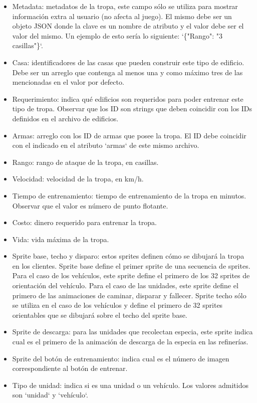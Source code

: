 \documentclass[titlepage,a4paper,12pt]{article}
\begin{document}
\begin{itemize}
\begin{itemize}
\item Metadata: metadatos de la tropa, este campo sólo se utiliza para mostrar información extra al usuario (no afecta al juego). El mismo debe ser un objeto JSON donde la clave es un nombre de atributo y el valor debe ser el valor del mismo. Un ejemplo de esto sería lo siguiente: `\{"Rango": "3 casillas"\}`.

\item Casa: identificadores de las casas que pueden construir este tipo de edificio. Debe ser un arreglo que contenga al menos una y como máximo tres de las mencionadas en el valor por defecto. 

\item Requerimiento: indica qué edificios son requeridos para poder entrenar este tipo de tropa. Observar que los ID son strings que deben coincidir con los IDs definidos en el archivo de edificios.

\item Armas: arreglo con los ID de armas que posee la tropa. El ID debe coincidir con el indicado en el atributo `armas` de este mismo archivo.

\item Rango: rango de ataque de la tropa, en casillas.

\item Velocidad: velocidad de la tropa, en km/h.

\item Tiempo de entrenamiento: tiempo de entrenamiento de la tropa en minutos. Observar que el valor es número de punto flotante.

\item Costo: dinero requerido para entrenar la tropa.

\item Vida: vida máxima de la tropa.

\item Sprite base, techo y disparo: estos sprites definen cómo se dibujará la tropa en los clientes.  Sprite base define el primer sprite de una secuencia de sprites. Para el caso de los vehículos, este sprite define el primero de los 32 sprites de orientación del vehículo. Para el caso de las unidades, este sprite define el primero de las animaciones de caminar, disparar y fallecer.  Sprite techo sólo se utiliza en el caso de los vehículos y define el primero de 32 sprites orientables que se dibujará sobre el techo del sprite base.

\item Sprite de descarga: para las unidades que recolectan especia, este sprite indica cual es el primero de la animación de descarga de la especia en las refinerías.

\item Sprite del botón de entrenamiento: indica cual es el número de imagen correspondiente al botón de entrenar.

\item Tipo de unidad: indica si es una unidad o un vehículo. Los valores admitidos son `unidad` y `vehículo`.

\end{itemize}

\end{itemize}
\end{document}

